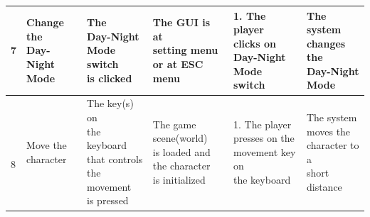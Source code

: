 \documentclass[12pt, titlepage]{article}
\begin{document}
\begin{center}
\begin{longtable}[!bpht]{|m{0.9cm}|m{2.6cm}|m{2.6cm}|m{2.7cm}|m{3.2cm}|m{2.7cm}|}
7 & \makecell[ml]{Change the\\ Day-Night\\ Mode} & \makecell[ml]{The\\ Day-Night\\ Mode switch\\ is clicked} & \makecell[ml]{The GUI is at\\ setting menu\\ or at ESC menu} & \makecell[ml]{1. The player\\ clicks on\\ Day-Night\\ Mode switch} & \makecell[ml]{The system\\ changes the\\ Day-Night\\ Mode}\\\hline\

8 & \makecell[ml]{Move the\\ character} & \makecell[ml]{The key(s) on\\ the keyboard\\ that controls\\ the movement\\ is pressed} & \makecell[ml]{The game\\ scene(world)\\ is loaded and\\ the character\\ is initialized} & \makecell[ml]{1. The player\\ presses on the\\ movement key on\\ the keyboard} & \makecell[ml]{The system\\ moves the\\ character to a\\ short distance}\\\hline


\end{longtable}
\end{center}
\end{document}
